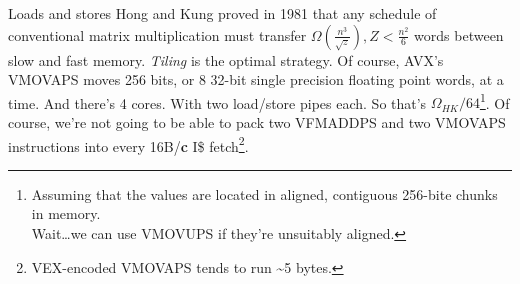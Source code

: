 \documentclass[mathserif,xcolor={dvipsnames,table}]{beamer}
\begin{document}
\begin{frame}{Loads and stores}
Hong and Kung proved in 1981 that any schedule of conventional matrix
multiplication must transfer $\Omega(\frac{n^{3}}{\sqrt{z}}), Z<\frac{n^{2}}{6}$
words between slow and fast memory. \textit{Tiling} is the optimal strategy.
\vfill
Of course, AVX's VMOVAPS moves 256 bits, or 8 32-bit single precision floating
point words, at a time. And there's 4 cores. With two load/store pipes each. So that's $\Omega_{HK}/64$\footnote{
\tiny{Assuming that the values are located in aligned, contiguous 256-bite chunks in memory.\\
\hspace{.6cm}Wait\ldots we can use VMOVUPS if they're unsuitably aligned.}}.
\vfill
Of course, we're not going to be able to pack two VFMADDPS and two VMOVAPS
instructions into every 16B/\textbf{c} I\$ fetch\footnote{\tiny{VEX-encoded
VMOVAPS tends to run \textasciitilde 5 bytes.}}.
\end{frame}

%
\end{document}
